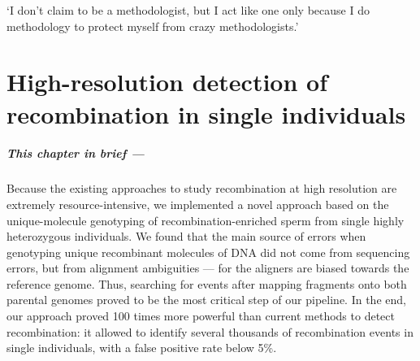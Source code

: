 \begin{savequote}[8cm]
	‘I don't claim to be a methodologist, but I act like one only because I do methodology to protect myself from crazy methodologists.’
	
	
\end{savequote}

\chapter{\label{ch:5-methodology}High-resolution detection of recombination in single individuals}

\minitoc{}

{\small{} \itshape{}

\paragraph{This chapter in brief —}

Because the existing approaches to study recombination at high resolution are extremely resource-intensive, we implemented a novel approach based on the unique-molecule genotyping of recombination-enriched sperm from single highly heterozygous individuals.
We found that the main source of errors when genotyping unique recombinant molecules of DNA did not come from sequencing errors, but from alignment ambiguities — for the aligners are biased towards the reference genome.
Thus, searching for events after mapping fragments onto both parental genomes proved to be the most critical step of our pipeline.
In the end, our approach proved 100 times more powerful than current methods to detect recombination: it allowed to identify several thousands of recombination events in single individuals, with a false positive rate below 5\%.

}

